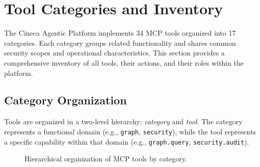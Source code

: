 
\section{Tool Categories and Inventory}
\label{sec:tool-inventory}

The Cineca Agentic Platform implements 34 MCP tools organized into 17 categories. Each category groups related functionality and shares common security scopes and operational characteristics. This section provides a comprehensive inventory of all tools, their actions, and their roles within the platform.

\subsection{Category Organization}
\label{subsec:category-organization}

Tools are organized in a two-level hierarchy: \textit{category} and \textit{tool}. The category represents a functional domain (e.g., \texttt{graph}, \texttt{security}), while the tool represents a specific capability within that domain (e.g., \texttt{graph.query}, \texttt{security.audit}).

\begin{figure}[htbp]
    \centering
    \caption{Hierarchical organization of MCP tools by category.}
    \label{fig:tool-hierarchy}
\end{figure}


